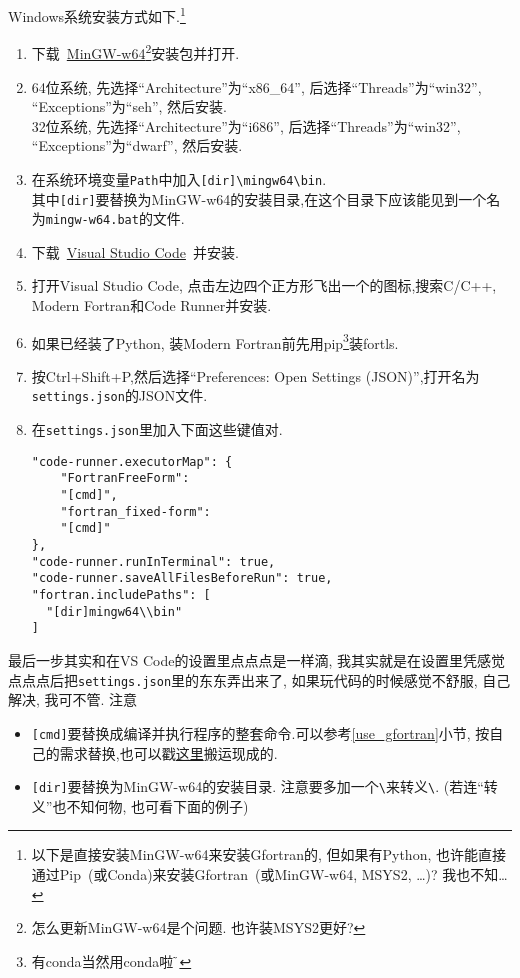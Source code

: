 Windows系统安装方式如下.\footnote{
    以下是直接安装MinGW-w64来安装Gfortran的, 但如果有Python, 也许能直接通过Pip~(或Conda)来安装Gfortran~(或MinGW-w64, MSYS2, \dots)? 我也不知\dots
}
\begin{enumerate}
    \item 下载~\href{https://sourceforge.net/projects/mingw-w64/files/Toolchains%20targetting%20Win32/Personal%20Builds/mingw-builds/installer/mingw-w64-install.exe/download}
    {MinGW-w64}\footnote{
      怎么更新MinGW-w64是个问题. 也许装MSYS2更好?
    }安装包并打开.
    \item 64位系统, 先选择``Architecture''为``x86\_64'', 后选择``Threads''为``win32'', ``Exceptions''为``seh'', 然后安装.\\32位系统, 先选择``Architecture''为``i686'', 后选择``Threads''为``win32'', ``Exceptions''为``dwarf'', 然后安装.
    \item 在系统环境变量\verb|Path|中加入\verb|[dir]\mingw64\bin|.\\其中\verb|[dir]|要替换为MinGW-w64的安装目录,在这个目录下应该能见到一个名为\verb|mingw-w64.bat|的文件.
    \item 下载~\href{https://code.visualstudio.com/sha/download?build=stable&os=win32-x64-user}
    {Visual Studio Code}~并安装.
    \item 打开Visual Studio Code, 点击左边四个正方形飞出一个的图标,搜索C/C++,  Modern Fortran和Code Runner并安装.
    \item[] 如果已经装了Python, 装Modern Fortran前先用pip\footnote{有conda当然用conda啦$\!\text{\~{}}$}装fortls.
    \item 按Ctrl+Shift+P,然后选择``Preferences: Open Settings (JSON)'',打开名为\verb|settings.json|的JSON文件.
    \item 在\verb|settings.json|里加入下面这些键值对.
    \begin{verbatim}
"code-runner.executorMap": {
    "FortranFreeForm":
    "[cmd]",
    "fortran_fixed-form":
    "[cmd]"
},
"code-runner.runInTerminal": true,
"code-runner.saveAllFilesBeforeRun": true,
"fortran.includePaths": [
  "[dir]mingw64\\bin"
]
    \end{verbatim}
\end{enumerate}

最后一步其实和在VS Code的设置里点点点是一样滴, 我其实就是在设置里凭感觉点点点后把\verb|settings.json|里的东东弄出来了, 如果玩代码的时候感觉不舒服, 自己解决, 我可不管. 注意
\begin{itemize}
    \item \verb|[cmd]|要替换成编译并执行程序的整套命令.可以参考\ref{use_gfortran}小节, 按自己的需求替换,也可以戳\href{https://zhuanlan.zhihu.com/p/362328064}{这里}搬运现成的.
    \item \verb|[dir]|要替换为MinGW-w64的安装目录. 注意要多加一个\verb|\|来转义\verb|\|. (若连``转义''也不知何物, 也可看下面的例子)
\end{itemize}

